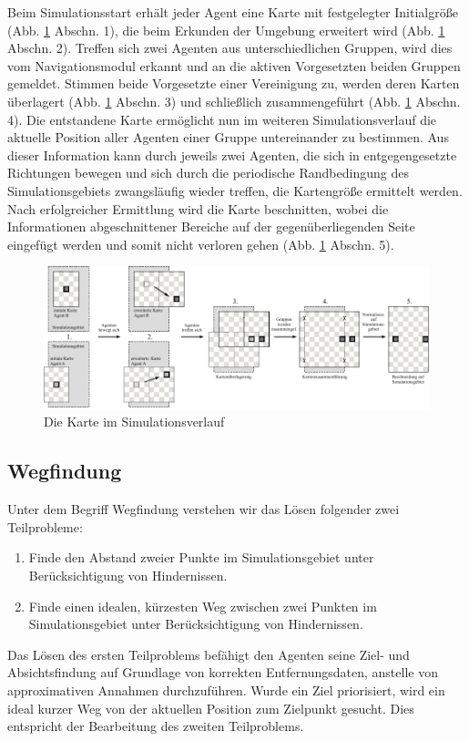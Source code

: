 \documentclass[runningheads]{llncs}
\begin{document}
	Beim Simulationsstart erhält jeder Agent eine Karte mit festgelegter Initialgröße (Abb. \ref{Karte} Abschn. 1), die beim Erkunden der Umgebung erweitert wird (Abb. \ref{Karte} Abschn. 2). Treffen sich zwei Agenten aus unterschiedlichen Gruppen, wird dies vom Navigationsmodul erkannt und an die aktiven Vorgesetzten beiden Gruppen gemeldet. Stimmen beide Vorgesetzte einer Vereinigung zu, werden deren Karten überlagert (Abb. \ref{Karte} Abschn. 3) und schließlich zusammengeführt (Abb. \ref{Karte} Abschn. 4). Die entstandene Karte ermöglicht nun im weiteren Simulationsverlauf die aktuelle Position aller Agenten einer Gruppe untereinander zu bestimmen. Aus dieser Information kann durch jeweils zwei Agenten, die sich in entgegengesetzte Richtungen bewegen und sich durch die periodische Randbedingung \cite{Bungartz2013} des Simulationsgebiets zwangsläufig wieder treffen, die Kartengröße ermittelt werden. Nach erfolgreicher Ermittlung wird die Karte beschnitten, wobei die Informationen abgeschnittener Bereiche auf der gegenüberliegenden Seite eingefügt werden und somit nicht verloren gehen (Abb. \ref{Karte} Abschn. 5).
	\begin{figure}[h]
		\includegraphics[scale=0.8]{./Referenzen/Kartenmerge.pdf}
		\caption{Die Karte im Simulationsverlauf}
		\label{Karte}
	\end{figure}
	
	\subsection{Wegfindung}\label{wegfindung}
	Unter dem Begriff Wegfindung verstehen wir das Lösen folgender zwei Teilprobleme:
	\begin{enumerate}
		\item Finde den Abstand zweier Punkte im Simulationsgebiet unter Berücksichtigung von Hindernissen.
		\item Finde einen idealen, kürzesten Weg zwischen zwei Punkten im Simulationsgebiet unter Berücksichtigung von Hindernissen.
	\end{enumerate}
	Das Lösen des ersten Teilproblems befähigt den Agenten seine Ziel- und Absichtsfindung auf Grundlage von korrekten Entfernungsdaten, anstelle von approximativen Annahmen durchzuführen.
	Wurde ein Ziel priorisiert, wird ein ideal kurzer Weg von der aktuellen Position zum Zielpunkt gesucht. Dies entspricht der Bearbeitung des zweiten Teilproblems.
	
\end{document}
